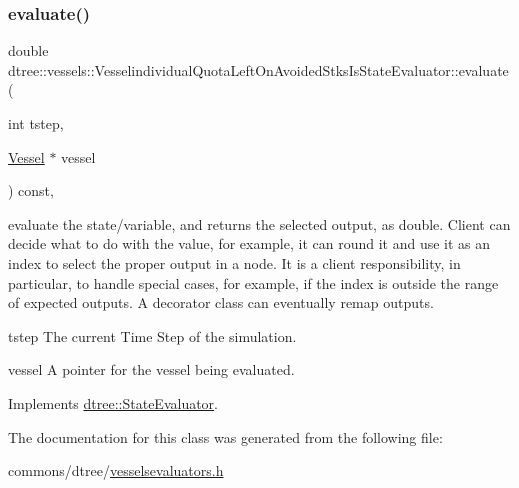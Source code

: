 \subsubsection{\texorpdfstring{evaluate()}{evaluate()}}
{\footnotesize\ttfamily double dtree\+::vessels\+::\+Vesselindividual\+Quota\+Left\+On\+Avoided\+Stks\+Is\+State\+Evaluator\+::evaluate (\begin{DoxyParamCaption}\item[{int}]{tstep,  }\item[{\mbox{\hyperlink{class_vessel}{Vessel}} $\ast$}]{vessel }\end{DoxyParamCaption}) const\hspace{0.3cm}{\ttfamily [inline]}, {\ttfamily [virtual]}}



evaluate the state/variable, and returns the selected output, as double. Client can decide what to do with the value, for example, it can round it and use it as an index to select the proper output in a node. It is a client responsibility, in particular, to handle special cases, for example, if the index is outside the range of expected outputs. A decorator class can eventually remap outputs. 

\begin{DoxyItemize}
\item tstep The current Time Step of the simulation. \item vessel A pointer for the vessel being evaluated. \end{DoxyItemize}


Implements \mbox{\hyperlink{classdtree_1_1_state_evaluator_ab57666219fbdc728f40d9d5acd5726cb}{dtree\+::\+State\+Evaluator}}.



The documentation for this class was generated from the following file\+:\begin{DoxyCompactItemize}
\item 
commons/dtree/\mbox{\hyperlink{vesselsevaluators_8h}{vesselsevaluators.\+h}}\end{DoxyCompactItemize}
